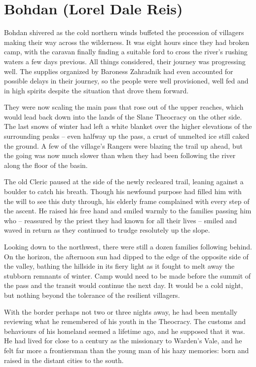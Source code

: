 \chapter{Bohdan (Lorel Dale Reis)}

Bohdan shivered as the cold northern winds buffeted the procession of villagers making their way across the wilderness. It was eight hours since they had broken camp, with the caravan finally finding a suitable ford to cross the river’s rushing waters a few days previous. All things considered, their journey was progressing well. The supplies organized by Baroness Zahradnik had even accounted for possible delays in their journey, so the people were well provisioned, well fed and in high spirits despite the situation that drove them forward.

 

They were now scaling the main pass that rose out of the upper reaches, which would lead back down into the lands of the Slane Theocracy on the other side. The last snows of winter had left a white blanket over the higher elevations of the surrounding peaks – even halfway up the pass, a crust of unmelted ice still caked the ground. A few of the village’s Rangers were blazing the trail up ahead, but the going was now much slower than when they had been following the river along the floor of the basin.

 

The old Cleric paused at the side of the newly recleared trail, leaning against a boulder to catch his breath. Though his newfound purpose had filled him with the will to see this duty through, his elderly frame complained with every step of the ascent. He raised his free hand and smiled warmly to the families passing him who – reassured by the priest they had known for all their lives – smiled and waved in return as they continued to trudge resolutely up the slope.

 

Looking down to the northwest, there were still a dozen families following behind. On the horizon, the afternoon sun had dipped to the edge of the opposite side of the valley, bathing the hillside in its fiery light as it fought to melt away the stubborn remnants of winter. Camp would need to be made before the summit of the pass and the transit would continue the next day. It would be a cold night, but nothing beyond the tolerance of the resilient villagers.

 

With the border perhaps not two or three nights away, he had been mentally reviewing what he remembered of his youth in the Theocracy. The customs and behaviours of his homeland seemed a lifetime ago, and he supposed that it was. He had lived for close to a century as the missionary to Warden’s Vale, and he felt far more a frontiersman than the young man of his hazy memories: born and raised in the distant cities to the south.

